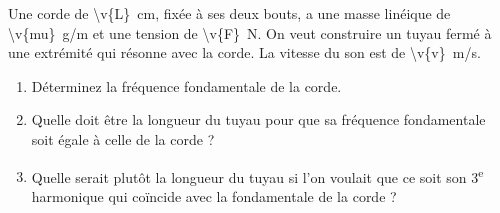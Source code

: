 Une corde de \qty{\v{L}}{cm}, fixée à ses deux bouts, a une masse linéique de \qty{\v{mu}}{g/m} et une tension de \qty{\v{F}}{N}. On veut construire un tuyau fermé à une extrémité qui résonne avec la corde. La vitesse du son est de \qty{\v{v}}{m/s}.

\begin{enumerate}[label=\alph*)]
    \item Déterminez la fréquence fondamentale de la corde.
    \item Quelle doit être la longueur du tuyau pour que sa fréquence fondamentale soit égale à celle de la corde ?
    \item Quelle serait plutôt la longueur du tuyau si l'on voulait que ce soit son 3\textsuperscript{e} harmonique qui coïncide avec la fondamentale de la corde ?
\end{enumerate}
